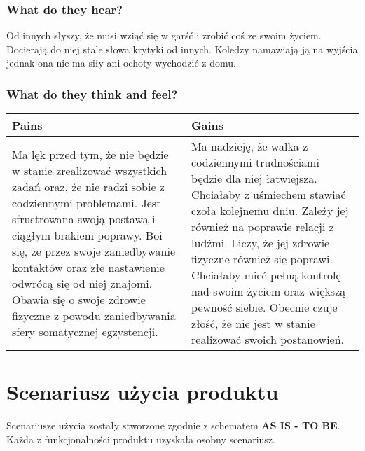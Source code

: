 \documentclass[12pt, letterpaper]{article}
\begin{document}
    \subsubsection*{What do they hear?}
    Od innych słyszy, że musi wziąć się w garść i zrobić coś ze swoim życiem. 
    Docierają do niej stale słowa krytyki od innych. Koledzy namawiają ją na 
    wyjścia jednak ona nie ma siły ani ochoty wychodzić z domu.  

    \subsubsection*{What do they think and feel?}

    \begin{center}
        \begin{tabular}{ | m{} | m{} | }
            \hline
            Pains & Gains \\ 
            \hline
            Ma lęk przed tym, że nie będzie w stanie zrealizować 
            wszystkich zadań oraz, że nie radzi sobie z codziennymi 
            problemami. Jest sfrustrowana swoją postawą i ciągłym 
            brakiem poprawy. Boi się, że przez swoje zaniedbywanie 
            kontaktów oraz złe nastawienie odwrócą się od niej znajomi. 
            Obawia się o swoje zdrowie fizyczne z powodu zaniedbywania 
            sfery somatycznej egzystencji. & 
            Ma nadzieję, że walka z codziennymi trudnościami będzie dla 
            niej łatwiejsza. Chciałaby z uśmiechem stawiać czoła 
            kolejnemu dniu. Zależy jej również na poprawie relacji 
            z ludźmi. Liczy, że jej zdrowie fizyczne również się 
            poprawi. Chciałaby mieć pełną kontrolę nad swoim życiem 
            oraz większą pewność siebie. Obecnie czuje złość, że nie
            jest w stanie realizować swoich postanowień.
            \\
            \hline  
        \end{tabular}
    \end{center}
    

    \section{Scenariusz użycia produktu}
    Scenariusze użycia zostały stworzone zgodnie z schematem \textbf{AS IS - TO BE}. Każda
    z funkcjonalności produktu uzyskała osobny scenariusz.
\end{document}
